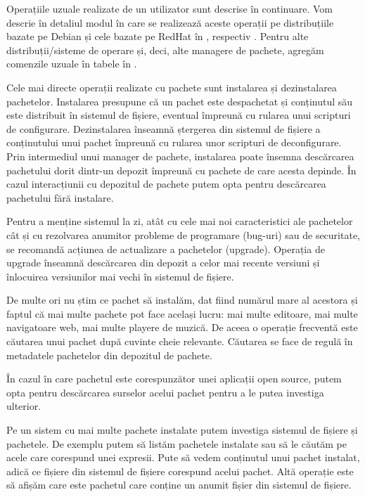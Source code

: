 Operațiile uzuale realizate de un utilizator sunt descrise în continuare. Vom descrie în detaliul modul în care se realizează aceste operații pe distribuțiile bazate pe Debian și cele bazate pe RedHat în , respectiv . Pentru alte distribuții/sisteme de operare și, deci, alte managere de pachete, agregăm comenzile uzuale în tabele în .

Cele mai directe operații realizate cu pachete sunt instalarea și dezinstalarea pachetelor. Instalarea presupune că un pachet este despachetat și conținutul său este distribuit în sistemul de fișiere, eventual împreună cu rularea unui scripturi de configurare. Dezinstalarea înseamnă ștergerea din sistemul de fișiere a conținutului unui pachet împreună cu rularea unor scripturi de deconfigurare. Prin intermediul unui manager de pachete, instalarea poate însemna descărcarea pachetului dorit dintr-un depozit împreună cu pachete de care acesta depinde. În cazul interacțiunii cu depozitul de pachete putem opta pentru descărcarea pachetului fără instalare.

Pentru a menține sistemul la zi, atât cu cele mai noi caracteristici ale pachetelor cât și cu rezolvarea anumitor probleme de programare (bug-uri) sau de securitate, se recomandă acțiunea de actualizare a pachetelor (upgrade). Operația de upgrade înseamnă descărcarea din depozit a celor mai recente versiuni și înlocuirea versiunilor mai vechi în sistemul de fișiere.

De multe ori nu știm ce pachet să instalăm, dat fiind numărul mare al acestora și faptul că mai multe pachete pot face același lucru: mai multe editoare, mai multe navigatoare web, mai multe playere de muzică. De aceea o operație frecventă este căutarea unui pachet după cuvinte cheie relevante. Căutarea se face de regulă în metadatele pachetelor din depozitul de pachete.

În cazul în care pachetul este corespunzător unei aplicații open source, putem opta pentru descărcarea surselor acelui pachet pentru a le putea investiga ulterior.

Pe un sistem cu mai multe pachete instalate putem investiga sistemul de fișiere și pachetele. De exemplu putem să listăm pachetele instalate sau să le căutăm pe acele care corespund unei expresii. Pute să vedem conținutul unui pachet instalat, adică ce fișiere din sistemul de fișiere corespund acelui pachet. Altă operație este să afișăm care este pachetul care conține un anumit fișier din sistemul de fișiere.


